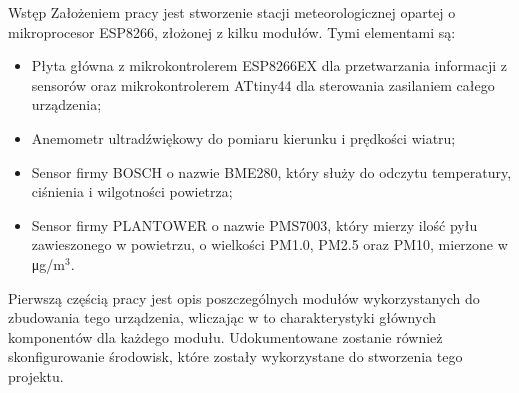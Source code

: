 \documentclass[12pt,a4paper]{scrartcl}
\begin{document}
\begin{section}	{\fontsize{14pt}{16.8pt} \tytulyrozdzialow Wstęp}
	\hspace{\parindent} Założeniem pracy jest stworzenie stacji meteorologicznej opartej o mikroprocesor ESP8266, złożonej z kilku modułów. Tymi elementami są:
	\begin{itemize}{}{}
		\item Płyta główna z mikrokontrolerem ESP8266EX dla przetwarzania informacji z sensorów oraz mikrokontrolerem ATtiny44 dla sterowania zasilaniem całego urządzenia;
		\item Anemometr ultradźwiękowy do pomiaru kierunku i prędkości wiatru;
		\item Sensor firmy BOSCH o nazwie BME280, który służy do odczytu temperatury, ciśnienia i wilgotności powietrza;
		\item Sensor firmy PLANTOWER o nazwie PMS7003, który mierzy ilość pyłu zawieszonego w powietrzu, o wielkości PM1.0, PM2.5 oraz PM10, mierzone w \si\micro g/m$^{3}$.
	\end{itemize}
	\par Pierwszą częścią pracy jest opis poszczególnych modułów wykorzystanych do zbudowania tego urządzenia, wliczając w to charakterystyki głównych komponentów dla każdego modułu. Udokumentowane zostanie również skonfigurowanie środowisk, które zostały wykorzystane do stworzenia tego projektu.
\end{section}
\end{document}
